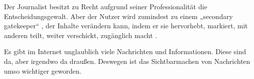 Der Journalist besitzt zu Recht aufgrund seiner Professionalität die
Entscheidungsgewalt. Aber der Nutzer wird zumindest zu einem „secondary
gatekeeper“ \autocite[S.~5]{santana:2014}, der Inhalte verändern kann, indem er
sie hervorhebt, markiert, mit anderen teilt, weiter verschickt, zugänglich macht
\autocite[S.~57]{singer:2014}.

Es gibt im Internet unglaublich viele Nachrichten und Informationen. Diese sind
da, aber irgendwo \glqq da draußen\grqq{}. Deswegen ist das \glqq
Sichtbarmachen\grqq{} von Nachrichten umso wichtiger geworden.

